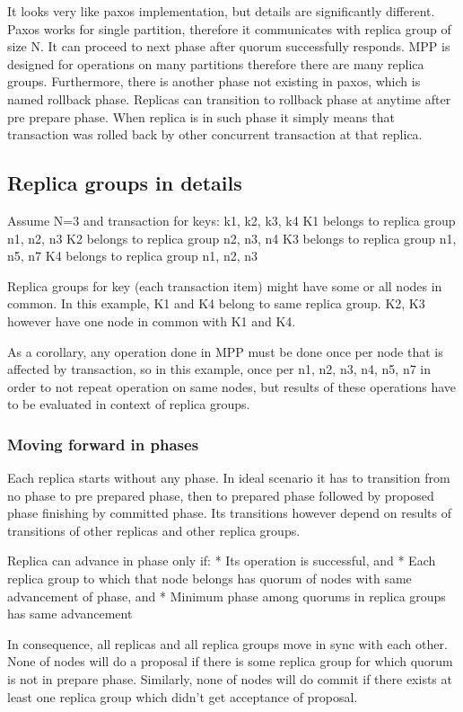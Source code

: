 It looks very like paxos implementation, but details are significantly different. 
Paxos works for single partition, therefore it communicates with replica group of size N. It can proceed to next phase after quorum successfully responds. 
MPP is designed for operations on many partitions therefore there are many replica groups. 
Furthermore, there is another phase not existing in paxos, which is named rollback phase. Replicas can transition to rollback phase at anytime after pre prepare phase. When replica is in such phase it simply means that transaction was rolled back by other concurrent transaction at that replica. 


\subsection{Replica groups in details}
Assume N=3 and transaction for keys: k1, k2, k3, k4 
K1 belongs to replica group n1, n2, n3
K2 belongs to replica group n2, n3, n4
K3 belongs to replica group n1, n5, n7
K4 belongs to replica group n1, n2, n3


Replica groups for key (each transaction item) might have some or all nodes in common.
In this example, K1 and K4 belong to same replica group. K2, K3 however have one node in common with K1 and K4.


As a corollary, any operation done in MPP must be done once per node that is affected by transaction, so in this example, once per n1, n2, n3, n4, n5, n7 in order to not repeat operation on same nodes, but results of these operations have to be evaluated in context of replica groups. 


\subsubsection{Moving forward in phases}
Each replica starts without any phase. In ideal scenario it has to transition from no phase to pre prepared phase, then to prepared phase followed by proposed phase finishing by committed phase. Its transitions however depend on results of transitions of other replicas and other replica groups.


Replica can advance in phase only if:
* Its operation is successful, and
* Each replica group to which that node belongs has quorum of nodes with same advancement of phase, and
* Minimum phase among quorums in replica groups has same advancement


In consequence, all replicas and all replica groups move in sync with each other. None of nodes will do a proposal if there is some replica group for which quorum is not in prepare phase. Similarly, none of nodes will do commit if there exists at least one replica group which didn’t get acceptance of proposal.


